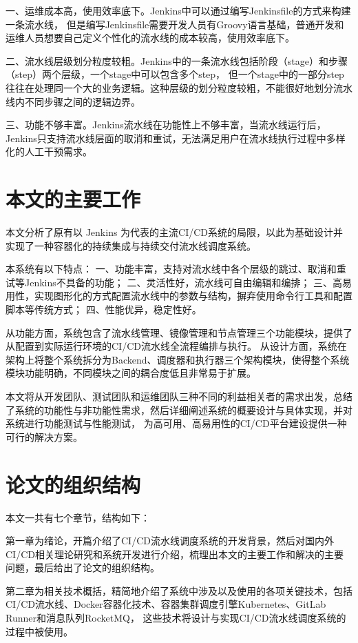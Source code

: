一、运维成本高，使用效率底下。Jenkins中可以通过编写Jenkinsfile的方式来构建一条流水线，
但是编写Jenkinsfile需要开发人员有Groovy语言基础，普通开发和运维人员想要自己定义个性化的流水线的成本较高，使用效率底下。

二、流水线层级划分粒度较粗。Jenkins中的一条流水线包括阶段（stage）和步骤（step）两个层级，一个stage中可以包含多个step，
但一个stage中的一部分step往往在处理同一个大的业务逻辑。这种层级的划分粒度较粗，不能很好地划分流水线内不同步骤之间的逻辑边界。

三、功能不够丰富。Jenkins流水线在功能性上不够丰富，当流水线运行后，Jenkins只支持流水线层面的取消和重试，无法满足用户在流水线执行过程中多样化的人工干预需求。


\section{本文的主要工作}
本文分析了原有以 Jenkins 为代表的主流CI/CD系统的局限，以此为基础设计并实现了一种容器化的持续集成与持续交付流水线调度系统。

本系统有以下特点：
一、功能丰富，支持对流水线中各个层级的跳过、取消和重试等Jenkins不具备的功能；
二、灵活性好，流水线可自由编辑和编排；
三、高易用性，实现图形化的方式配置流水线中的参数与结构，摒弃使用命令行工具和配置脚本等传统方式；
四、性能优异，稳定性好。

从功能方面，系统包含了流水线管理、镜像管理和节点管理三个功能模块，提供了从配置到实际运行环境的CI/CD流水线全流程编排与执行。
从设计方面，系统在架构上将整个系统拆分为Backend、调度器和执行器三个架构模块，使得整个系统模块功能明确，不同模块之间的耦合度低且非常易于扩展。

本文将从开发团队、测试团队和运维团队三种不同的利益相关者的需求出发，总结了系统的功能性与非功能性需求，然后详细阐述系统的概要设计与具体实现，并对系统进行功能测试与性能测试，
为高可用、高易用性的CI/CD平台建设提供一种可行的解决方案。

\section{论文的组织结构}
本文一共有七个章节，结构如下：

第一章为绪论，开篇介绍了CI/CD流水线调度系统的开发背景，然后对国内外CI/CD相关理论研究和系统开发进行介绍，梳理出本文的主要工作和解决的主要问题，最后给出了论文的组织结构。

第二章为相关技术概括，精简地介绍了系统中涉及以及使用的各项关键技术，包括CI/CD流水线、Docker容器化技术、容器集群调度引擎Kubernetes、GitLab Runner和消息队列RocketMQ，
这些技术将设计与实现CI/CD流水线调度系统的过程中被使用。

